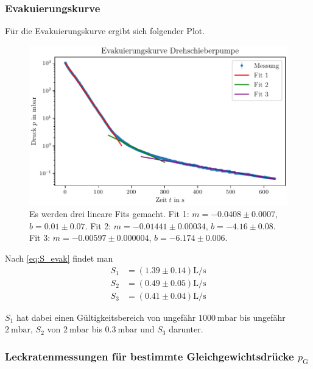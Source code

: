 \subsubsection{Evakuierungskurve}

Für die Evakuierungskurve ergibt sich folgender Plot.

\begin{figure}[H]
    \centering
    \includegraphics[width=\textwidth]{plots/DP_Evakuierungskurve.pdf}
    \caption{Es werden drei lineare Fits gemacht. Fit 1: $m = \num{-0.0408} \pm \num{0.0007}$, $b = \num{0.01} \pm \num{0.07}$. Fit 2: $m = \num{-0.01441} \pm \num{0.00034}$, $b = \num{-4.16} \pm \num{0.08}$. Fit 3: $m = \num{-0.00597} \pm \num{0.000004}$, $b = \num{-6.174} \pm \num{0.006}$.}
    \label{fig:DP_evak}
\end{figure}

Nach \eqref{eq:S_evak} findet man
\begin{align}
    S_1 &= (\num{1.39} \pm \num{0.14}) \si{\liter\per\second} \\
    S_2 &= (\num{0.49} \pm \num{0.05}) \si{\liter\per\second} \\
    S_3 &= (\num{0.41} \pm \num{0.04}) \si{\liter\per\second} 
\end{align}

$S_1$ hat dabei einen Gültigkeitsbereich von ungefähr $\SI{1000}{\milli\bar}$ bis ungefähr $\SI{2}{\milli\bar}$, $S_2$ von $\SI{2}{\milli\bar}$ bis $\SI{0.3}{\milli\bar}$ und $S_3$ darunter.

\subsubsection{Leckratenmessungen für bestimmte Gleichgewichtsdrücke $p_\text{G}$}

